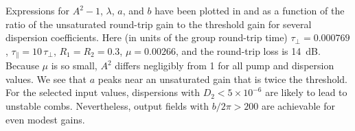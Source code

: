 Expressions for $A^2 - 1$, $\lambda$, $a$, and $b$ have been plotted in  and  as a function of the ratio of the unsaturated round-trip gain to the threshold gain for several dispersion coefficients. Here (in units of the group round-trip time) $\tau_\perp = 0.000769$, $\tau_\parallel = 10\, \tau_\perp$, $R_1 = R_2 = 0.3$, $\mu = 0.00266$, and the round-trip loss is 14~dB. Because $\mu$ is so small, $A^2$ differs negligibly from 1 for all pump and dispersion values. We see that $a$ peaks near an unsaturated gain that is twice the threshold. For the selected input values, dispersions with $D_2 < 5 \times 10^{-6}$ are likely to lead to unstable combs. Nevertheless, output fields with $b/2 \pi > 200$ are achievable for even modest gains.


